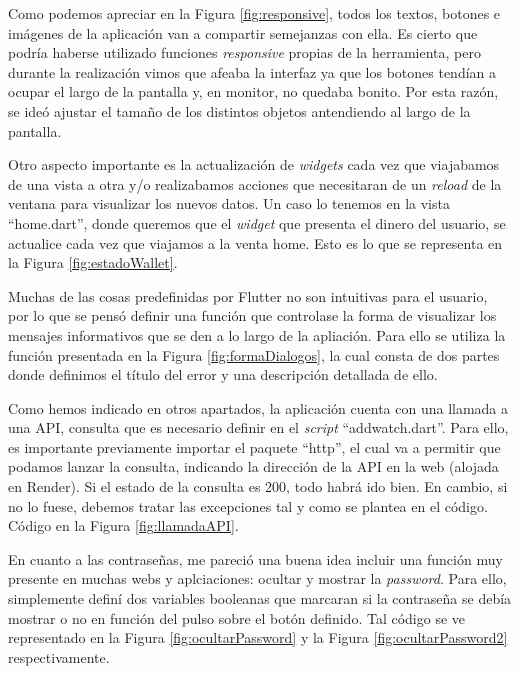 	Como podemos apreciar en la Figura \ref{fig:responsive}, todos los textos, botones e imágenes de la aplicación van a compartir semejanzas con ella. Es cierto que podría haberse utilizado funciones \emph{responsive} propias de la herramienta, pero durante la realización vimos que afeaba la interfaz ya que los botones tendían a ocupar el largo de la pantalla y, en monitor, no quedaba bonito. Por esta razón, se ideó ajustar el tamaño de los distintos objetos antendiendo al largo de la pantalla.
	

	Otro aspecto importante es la actualización de \emph{widgets} cada vez que viajabamos de una vista a otra y/o realizabamos acciones que necesitaran de un \emph{reload} de la ventana para visualizar los nuevos datos. Un caso lo tenemos en la vista ``home.dart'', donde queremos que el \emph{widget} que presenta el dinero del usuario, se actualice cada vez que viajamos a la venta home. Esto es lo que se representa en la Figura \ref{fig:estadoWallet}. 


	Muchas de las cosas predefinidas por Flutter no son intuitivas para el usuario, por lo que se pensó definir una función que controlase la forma de visualizar los mensajes informativos que se den a lo largo de la apliación. Para ello se utiliza la función presentada en la Figura \ref{fig:formaDialogos}, la cual consta de dos partes donde definimos el título del error y una descripción detallada de ello.
	

	Como hemos indicado en otros apartados, la aplicación cuenta con una llamada a una API, consulta que es necesario definir en el \emph{script} ``addwatch.dart''. Para ello, es importante previamente importar el paquete ``http'', el cual va a permitir que podamos lanzar la consulta, indicando la dirección de la API en la web (alojada en Render). Si el estado de la consulta es 200, todo habrá ido bien. En cambio, si no lo fuese, debemos tratar las excepciones tal y como se plantea en el código. Código en la Figura \ref{fig:llamadaAPI}.


	En cuanto a las contraseñas, me pareció una buena idea incluir una función muy presente en muchas webs y aplciaciones: ocultar y mostrar la \emph{password}. Para ello, simplemente definí dos variables booleanas que marcaran si la contraseña se debía mostrar o no en función del pulso sobre el botón definido. Tal código se ve representado en la Figura \ref{fig:ocultarPassword} y la Figura \ref{fig:ocultarPassword2} respectivamente.

